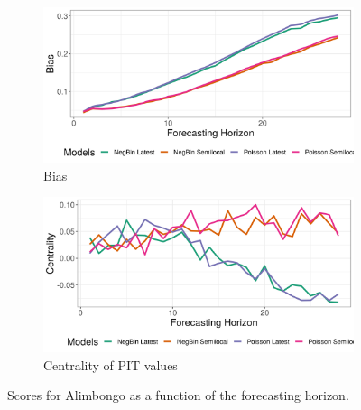 \begin{figure}[H]
\begin{subfigure}{0.5\textwidth}
  \centering
  \includegraphics[width=\linewidth]{../output/Alimbongo_bias.png}  
  \caption{Bias}
  \label{fig:Alimbongo_scores_3}
\end{subfigure}
\begin{subfigure}{0.5\textwidth}
  \centering
  \includegraphics[width=\linewidth]{../output/Alimbongo_centrality.png}  
  \caption{Centrality of PIT values}
  \label{fig:Alimbongo_scores_4}
\end{subfigure}
  \caption{Scores for Alimbongo as a function of the forecasting horizon.}

  \label{fig:nat_scores}
\end{figure}
